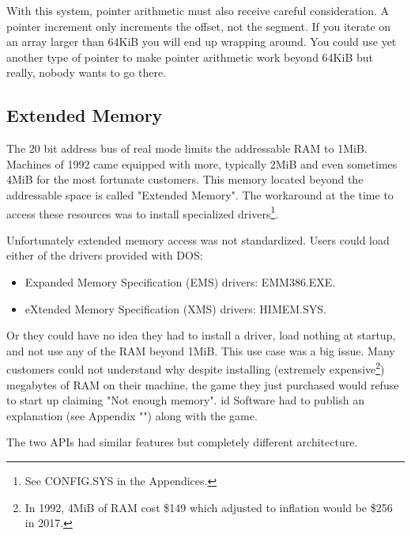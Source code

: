 \documentclass[book.tex]{subfiles}
\begin{document}
\begin{minipage}{\textwidth}

\end{minipage}
\par

With this system, pointer arithmetic must also receive careful consideration. A  pointer increment only increments the offset, not the segment. If you iterate on an array larger than 64KiB you will end up wrapping around. You could use yet another type of pointer  to make pointer arithmetic work beyond 64KiB but really, nobody wants to go there.




  \subsection{Extended Memory}

The 20 bit address bus of real mode limits the addressable RAM to 1MiB. Machines of 1992 came equipped with more, typically 2MiB and even sometimes 4MiB for the most fortunate customers. This memory located beyond the addressable space is called "Extended Memory". The workaround at the time to access these resources was to install specialized drivers\footnote{See CONFIG.SYS in the Appendices.}.\\
\par
Unfortunately extended memory access was not standardized. Users could load either of the drivers provided with DOS:
\begin{itemize}
\item Expanded Memory Specification (EMS) drivers: EMM386.EXE.
\item eXtended Memory Specification (XMS) drivers: HIMEM.SYS.
\end{itemize}

Or they could have no idea they had to install a driver, load nothing at startup, and not use any of the RAM beyond 1MiB. This use case was a big issue. Many customers could not understand why despite installing (extremely expensive\footnote{In 1992, 4MiB of RAM cost \$149 which adjusted to inflation would be \$256 in 2017.}) megabytes of RAM on their machine, the game they just purchased would refuse to start up claiming "Not enough memory". id Software had to publish an explanation (see Appendix "") along with the game.\\
\par

The two APIs had similar features but completely different architecture.\\
\par
\end{document}
